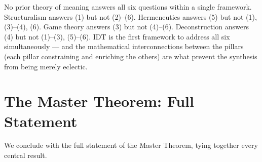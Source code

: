 \begin{interpretation}
No prior theory of meaning answers all six questions within a single
framework.  Structuralism answers (1) but not (2)--(6).  Hermeneutics
answers (5) but not (1), (3)--(4), (6).  Game theory answers (3) but not
(4)--(6).  Deconstruction answers (4) but not (1)--(3), (5)--(6).  IDT is
the first framework to address all six simultaneously --- and the
mathematical interconnections between the pillars (each pillar
constraining and enriching the others) are what prevent the synthesis
from being merely eclectic.
\end{interpretation}

\section{The Master Theorem: Full Statement}

We conclude with the full statement of the Master Theorem, tying together
every central result.

